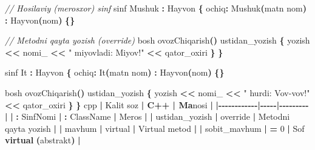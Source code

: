 \documentclass[a4paper,11pt,twoside,openright]{book}
\newenvironment{Shaded}{\begin{snugshade}}{\end{snugshade}}
\newcommand{\CharTok}[1]{\textcolor[rgb]{0.31,0.60,0.02}{#1}}
\newcommand{\CommentTok}[1]{\textcolor[rgb]{0.56,0.35,0.01}{\textit{#1}}}
\newcommand{\DecValTok}[1]{\textcolor[rgb]{0.00,0.00,0.81}{#1}}
\newcommand{\ErrorTok}[1]{\textcolor[rgb]{0.64,0.00,0.00}{\textbf{#1}}}
\newcommand{\KeywordTok}[1]{\textcolor[rgb]{0.13,0.29,0.53}{\textbf{#1}}}
\newcommand{\NormalTok}[1]{#1}
\newcommand{\OperatorTok}[1]{\textcolor[rgb]{0.81,0.36,0.00}{\textbf{#1}}}
\newcommand{\StringTok}[1]{\textcolor[rgb]{0.31,0.60,0.02}{#1}}
\newcommand{\VariableTok}[1]{\textcolor[rgb]{0.00,0.00,0.00}{#1}}
\begin{document}
\begin{Shaded}
\begin{Highlighting}[]
\CommentTok{// Hosilaviy (merosxo\textquotesingle{}r) sinf}
\NormalTok{sinf Mushuk }\OperatorTok{:}\NormalTok{ Hayvon }\OperatorTok{\{}
\NormalTok{ochiq}\OperatorTok{:}
\NormalTok{    Mushuk}\OperatorTok{(}\NormalTok{matn nom}\OperatorTok{)} \OperatorTok{:}\NormalTok{ Hayvon}\OperatorTok{(}\NormalTok{nom}\OperatorTok{)} \OperatorTok{\{\}}

    \CommentTok{// Metodni qayta yozish (override)}
\NormalTok{    bosh ovozChiqarish}\OperatorTok{()}\NormalTok{ ustidan\_yozish }\OperatorTok{\{}
\NormalTok{        yozish }\OperatorTok{\textless{}\textless{}} \VariableTok{nomi\_} \OperatorTok{\textless{}\textless{}} \StringTok{" miyovladi: Miyov!"} \OperatorTok{\textless{}\textless{}}\NormalTok{ qator\_oxiri}
    \OperatorTok{\}}
\OperatorTok{\}}

\NormalTok{sinf It }\OperatorTok{:}\NormalTok{ Hayvon }\OperatorTok{\{}
\NormalTok{ochiq}\OperatorTok{:}
\NormalTok{    It}\OperatorTok{(}\NormalTok{matn nom}\OperatorTok{)} \OperatorTok{:}\NormalTok{ Hayvon}\OperatorTok{(}\NormalTok{nom}\OperatorTok{)} \OperatorTok{\{\}}

\NormalTok{    bosh ovozChiqarish}\OperatorTok{()}\NormalTok{ ustidan\_yozish }\OperatorTok{\{}
\NormalTok{        yozish }\OperatorTok{\textless{}\textless{}} \VariableTok{nomi\_} \OperatorTok{\textless{}\textless{}} \StringTok{" hurdi: Vov{-}vov!"} \OperatorTok{\textless{}\textless{}}\NormalTok{ qator\_oxiri}
    \OperatorTok{\}}
\OperatorTok{\}}
\ErrorTok{\textasciigrave{}\textasciigrave{}\textasciigrave{}}\NormalTok{cpp}
\OperatorTok{|}\NormalTok{ Kalit so}\CharTok{\textquotesingle{}z}\ErrorTok{ | C++ | Ma}\CharTok{\textquotesingle{}}\NormalTok{nosi }\OperatorTok{|}
\OperatorTok{|{-}{-}{-}{-}{-}{-}{-}{-}{-}{-}{-}{-}|{-}{-}{-}{-}{-}|{-}{-}{-}{-}{-}{-}{-}{-}{-}|}
\OperatorTok{|} \ErrorTok{\textasciigrave{}}\OperatorTok{:}\NormalTok{ SinfNomi}\ErrorTok{\textasciigrave{}} \OperatorTok{|} \ErrorTok{\textasciigrave{}}\OperatorTok{:}\NormalTok{ ClassName}\ErrorTok{\textasciigrave{}} \OperatorTok{|}\NormalTok{ Meros }\OperatorTok{|}
\OperatorTok{|} \ErrorTok{\textasciigrave{}}\NormalTok{ustidan\_yozish}\ErrorTok{\textasciigrave{}} \OperatorTok{|} \ErrorTok{\textasciigrave{}}\NormalTok{override}\ErrorTok{\textasciigrave{}} \OperatorTok{|}\NormalTok{ Metodni qayta yozish }\OperatorTok{|}
\OperatorTok{|} \ErrorTok{\textasciigrave{}}\NormalTok{mavhum}\ErrorTok{\textasciigrave{}} \OperatorTok{|} \ErrorTok{\textasciigrave{}}\NormalTok{virtual}\ErrorTok{\textasciigrave{}} \OperatorTok{|}\NormalTok{ Virtual metod }\OperatorTok{|}
\OperatorTok{|} \ErrorTok{\textasciigrave{}}\NormalTok{sobit\_mavhum}\ErrorTok{\textasciigrave{}} \OperatorTok{|} \ErrorTok{\textasciigrave{}}\OperatorTok{=} \DecValTok{0}\ErrorTok{\textasciigrave{}} \OperatorTok{|}\NormalTok{ Sof }\KeywordTok{virtual} \OperatorTok{(}\NormalTok{abstrakt}\OperatorTok{)} \OperatorTok{|}


\end{Highlighting}
\end{Shaded}
\end{document}
